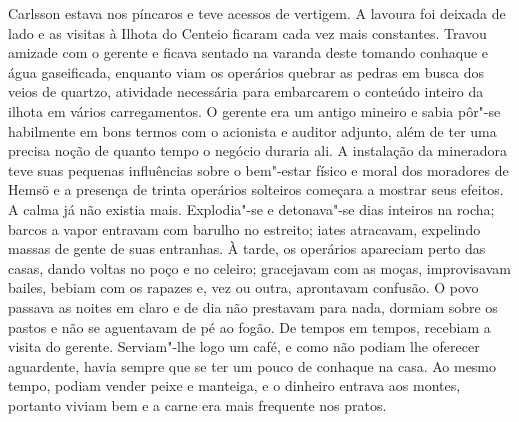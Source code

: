 Carlsson estava nos píncaros e teve acessos de vertigem. A lavoura foi deixada
de lado e as visitas à Ilhota do Centeio ficaram cada vez mais constantes. Travou 
amizade com o gerente e ficava sentado na varanda deste tomando conhaque
e água gaseificada, enquanto viam os operários quebrar as pedras em busca dos
veios de quartzo, atividade necessária para embarcarem o conteúdo inteiro da
ilhota em vários carregamentos. O gerente era um antigo mineiro e sabia pôr"-se 
habilmente em bons termos com o acionista e auditor adjunto, além de ter uma
precisa noção de quanto tempo o negócio duraria ali. A instalação da mineradora
teve suas pequenas influências sobre o bem"-estar físico e moral dos moradores de
Hemsö e a presença de trinta operários solteiros começara a mostrar seus
efeitos. A calma já não existia mais. Explodia"-se e detonava"-se dias inteiros
na rocha; barcos a vapor entravam com barulho no estreito; iates atracavam,
expelindo massas de gente de suas entranhas. À tarde, os operários apareciam
perto das casas, dando voltas no poço e no celeiro; gracejavam com as
moças, improvisavam bailes, bebiam com os rapazes e, vez ou outra, aprontavam
confusão. O povo passava as noites em claro e de dia não prestavam para nada,
dormiam sobre os pastos e não se aguentavam de pé ao fogão. De tempos em tempos,
recebiam a visita do gerente. Serviam"-lhe logo um café, e como não podiam lhe
oferecer aguardente, havia sempre que se ter um pouco de conhaque na casa. Ao
mesmo tempo, podiam vender peixe e manteiga, e o dinheiro entrava aos montes,
portanto viviam bem e a carne era mais frequente nos pratos.

